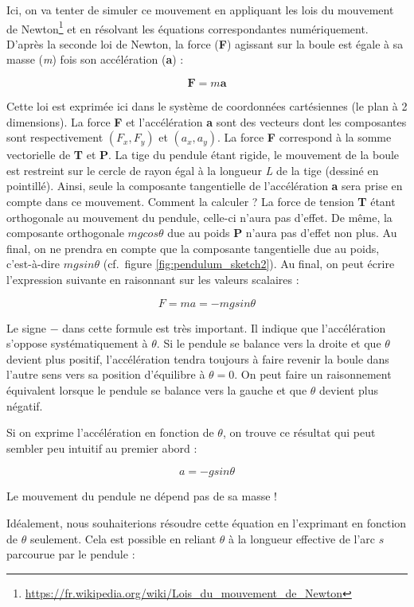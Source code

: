 \documentclass[a4paper,11pt,twoside]{book}
\renewcommand{\href}[2]{#2\footnote{\url{#1}}}
\begin{document}
Ici, on va tenter de simuler ce mouvement en appliquant les
\href{https://fr.wikipedia.org/wiki/Lois_du_mouvement_de_Newton}{lois du
mouvement de Newton} et en résolvant les équations correspondantes
numériquement. D'après la seconde loi de Newton, la force (\textbf{F})
agissant sur la boule est égale à sa masse (\emph{m}) fois son
accélération (\textbf{a}) :

\[\boldsymbol{\mathbf F} = m \boldsymbol{\mathbf a}\]

Cette loi est exprimée ici dans le système de coordonnées cartésiennes
(le plan à 2 dimensions). La force \textbf{F} et l'accélération
\textbf{a} sont des vecteurs dont les composantes sont respectivement
\((F_{x}, F_{y})\) et \((a_{x}, a_{y})\). La force \textbf{F} correspond
à la somme vectorielle de \textbf{T} et \textbf{P}. La tige du pendule
étant rigide, le mouvement de la boule est restreint sur le cercle de
rayon égal à la longueur \emph{L} de la tige (dessiné en pointillé).
Ainsi, seule la composante tangentielle de l'accélération \textbf{a}
sera prise en compte dans ce mouvement. Comment la calculer ? La force
de tension \textbf{T} étant orthogonale au mouvement du pendule,
celle-ci n'aura pas d'effet. De même, la composante orthogonale
\(mgcos \theta\) due au poids \textbf{P} n'aura pas d'effet non plus. Au
final, on ne prendra en compte que la composante tangentielle due au
poids, c'est-à-dire \(mg sin \theta\) (cf.~figure
\ref{fig:pendulum_sketch2}). Au final, on peut écrire l'expression
suivante en raisonnant sur les valeurs scalaires :

\[F = ma = -mg sin \theta\]

Le signe \(-\) dans cette formule est très important. Il indique que
l'accélération s'oppose systématiquement à \(\theta\). Si le pendule se
balance vers la droite et que \(\theta\) devient plus positif,
l'accélération tendra toujours à faire revenir la boule dans l'autre
sens vers sa position d'équilibre à \(\theta = 0\). On peut faire un
raisonnement équivalent lorsque le pendule se balance vers la gauche et
que \(\theta\) devient plus négatif.

Si on exprime l'accélération en fonction de \(\theta\), on trouve ce
résultat qui peut sembler peu intuitif au premier abord :

\[a = -g sin \theta\]

Le mouvement du pendule ne dépend pas de sa masse !

Idéalement, nous souhaiterions résoudre cette équation en l'exprimant en
fonction de \(\theta\) seulement. Cela est possible en reliant
\(\theta\) à la longueur effective de l'arc \(s\) parcourue par le
pendule :
\end{document}

